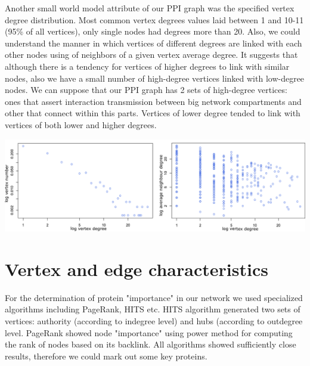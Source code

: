 \documentclass[a0,portrait]{a0poster}
\begin{document}
\begin{multicols}{2}
Another small world model attribute of our PPI graph was the specified vertex degree distribution. Most common vertex degrees values laid between 1 and 10-11 (95\% of all vertices), only single nodes had degrees more than 20. Also, we could understand the manner in which vertices of different degrees are linked with each other nodes using of neighbors of a given vertex average degree. It suggests that although there is a tendency for vertices of higher degrees to link with similar nodes, also we have a small number of high-degree vertices linked with low-degree nodes. We can suppose that our PPI graph has 2 sets of high-degree vertices: ones that assert interaction transmission between big network compartments and other that connect within this parts. Vertices of lower degree tended to link with vertices of both lower and higher degrees. 

\begin{center}\vspace{.1cm}
\includegraphics[width=1\linewidth]{degrees.pdf}
\end{center}\vspace{.1cm}

\section*{Vertex and edge characteristics}

For the determination of protein "importance" in our network we used specialized algorithms including PageRank, HITS etc.  HITS algorithm generated two sets of vertices: authority (according to indegree level) and hubs (according to outdegree level. PageRank showed node "importance" using power method for computing the rank of nodes based on its backlink.  All algorithms showed sufficiently close results, therefore we could mark out some key proteins.


\end{multicols}
\end{document}
